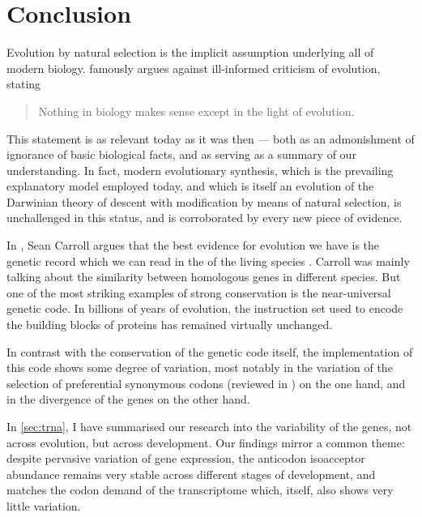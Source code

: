 \chapter{Conclusion}
\label{sec:conclusion}


\noindent
Evolution by natural selection is the implicit assumption underlying all of
modern biology. \citet{Dobzhansky:1973} famously argues against ill-informed
criticism of evolution, stating

\begin{quote}
    Nothing in biology makes sense except in the light of evolution.
\end{quote}

This statement is as relevant today as it was then --- both as an admonishment
of ignorance of basic biological facts, and as serving as a summary of our
understanding. In fact, modern evolutionary synthesis, which is the prevailing
explanatory model employed today, and which is itself an evolution of the
Darwinian theory of descent with modification by means of natural selection, is
unchallenged in this status, and is corroborated by every new piece of evidence.

In , Sean Carroll argues that the best
evidence for evolution we have is the genetic record which we can read in the
\dna of the living species \citep{Carroll:2006}. Carroll was mainly talking
about the similarity between homologous genes in different species. But one of
the most striking examples of strong conservation is the near-universal genetic
code. In billions of years of evolution, the instruction set used to encode the
building blocks of proteins has remained virtually unchanged.

In contrast with the conservation of the genetic code itself, the implementation
of this code shows some degree of variation, most notably in the variation of
the selection of preferential synonymous codons (reviewed in
\citet{Ermolaeva:2001}) on the one hand, and in the divergence of the \trna
genes \citep{Kutter:2011} on the other hand.

In \cref{sec:trna}, I have summarised our research into the variability of the
\trna genes, not across evolution, but across development. Our findings mirror a
common theme: despite pervasive variation of \trna gene expression, the
anticodon isoacceptor \trna abundance remains very stable across different
stages of development, and matches the codon demand of the transcriptome which,
itself, also shows very little variation.

